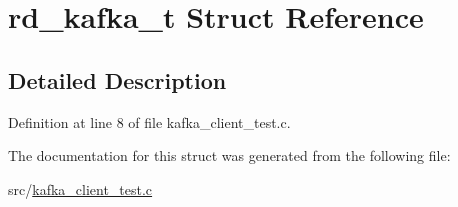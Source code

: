 \hypertarget{structrd__kafka__t}{\section{rd\-\_\-kafka\-\_\-t Struct Reference}
\label{structrd__kafka__t}
}


\subsection{Detailed Description}


Definition at line 8 of file kafka\-\_\-client\-\_\-test.\-c.



The documentation for this struct was generated from the following file\-:\begin{DoxyCompactItemize}
\item 
src/\hyperlink{kafka__client__test_8c}{kafka\-\_\-client\-\_\-test.\-c}\end{DoxyCompactItemize}
